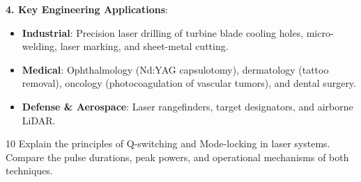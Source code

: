 \begin{theorysol}
\textbf{4. Key Engineering Applications}:
\begin{itemize}
    \item \textbf{Industrial}: Precision laser drilling of turbine blade cooling holes, micro-welding, laser marking, and sheet-metal cutting.
    \item \textbf{Medical}: Ophthalmology (Nd:YAG capsulotomy), dermatology (tattoo removal), oncology (photocoagulation of vascular tumors), and dental surgery.
    \item \textbf{Defense \& Aerospace}: Laser rangefinders, target designators, and airborne LiDAR.
\end{itemize}
\end{theorysol}
\vspace{4mm}

\begin{theoryq}{10}
Explain the principles of Q-switching and Mode-locking in laser systems. Compare the pulse durations, peak powers, and operational mechanisms of both techniques.
\end{theoryq}
